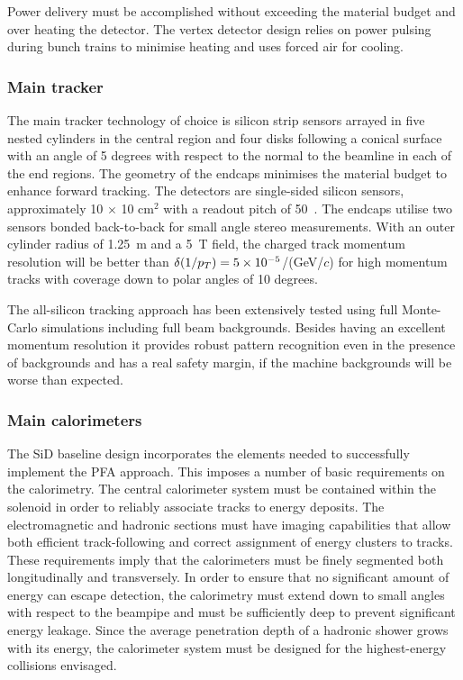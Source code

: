 Power delivery must be accomplished without exceeding the material budget and
over heating the detector.  The vertex detector 
design relies on power pulsing during bunch trains to minimise heating 
and uses forced air for cooling. 

\subsubsection{Main tracker}
The main tracker technology of
choice is silicon strip sensors arrayed in five nested cylinders in the central
region and four disks following a conical surface with an angle of 5 degrees
with respect to the normal to the beamline in each of the end regions. The geometry of the endcaps
minimises the material budget to enhance forward tracking. The detectors are
single-sided silicon sensors, approximately 10 $\times$ 10 cm$^2$ with a readout
pitch of 50~\micron. The endcaps utilise two sensors bonded back-to-back for
small angle stereo measurements. With an outer cylinder radius of 1.25~m
and a 5~T field, the charged track momentum resolution will be better than
$\delta (1/p_T) = 5 \times 10^{-5} $/(GeV/$c$) for high momentum tracks with coverage down to polar angles of 10 degrees.

The all-silicon tracking approach has been extensively tested using full Monte-Carlo
simulations including full beam backgrounds. Besides having an excellent momentum resolution
it provides robust pattern recognition even in the presence of backgrounds and has a
real safety margin, if the machine backgrounds will be worse than expected.

\subsubsection{Main calorimeters}

The SiD  baseline design incorporates the elements needed to
successfully implement the PFA approach. This imposes a number of
basic requirements on the calorimetry. The central calorimeter
system must be contained within the solenoid in order to reliably associate
tracks to energy deposits. The electromagnetic and hadronic sections
must have imaging capabilities that allow both efficient
track-following and correct assignment of energy clusters to tracks. These
requirements imply that the calorimeters must be finely segmented both
longitudinally and transversely. In order to ensure that no significant amount
of energy can escape detection, the calorimetry must extend down to small
angles with respect to the beampipe and must be sufficiently deep to prevent
significant energy leakage. Since the average penetration depth of a hadronic
shower grows with its energy, the calorimeter system must be designed for the
highest-energy collisions envisaged.

